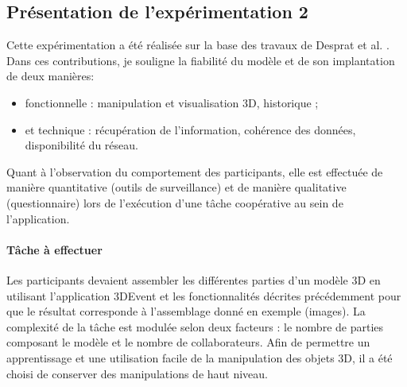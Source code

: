 

\subsection{Présentation de l'expérimentation 2}
 Cette expérimentation a été réalisée sur la base des travaux de Desprat et al.  
\cite{Desprat2016,Desprat2017}. Dans ces contributions, je souligne la fiabilité 
du modèle et de son implantation de deux manières: 
\begin{itemize}
	\item fonctionnelle : manipulation et visualisation 
	3D, historique ;
	\item et technique : récupération de l'information, cohérence des 
	données, disponibilité du réseau.
\end{itemize}

Quant à l'observation du comportement des participants, elle est 
effectuée de manière quantitative (outils de surveillance) et de manière qualitative 
(questionnaire) lors de l'exécution d'une tâche 
coopérative au sein de l'application.


\paragraph{Tâche à effectuer}
Les participants devaient assembler les différentes parties d'un modèle \gls{3D} en 
utilisant l'application 3DEvent et les fonctionnalités décrites précédemment pour que le résultat corresponde à l'assemblage 
donné en exemple (images). La complexité de la tâche est modulée selon 
deux facteurs : le nombre de parties composant le modèle et le nombre de 
collaborateurs. Afin de permettre un apprentissage et une utilisation facile de la manipulation des objets \gls{3D}, il a été choisi de conserver des manipulations de haut niveau.
